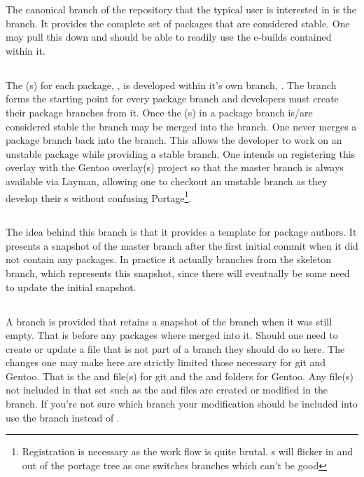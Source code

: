 \documentclass{article}
\begin{document}
The canonical branch of the repository that the typical user is interested in is the  branch. 
It provides the complete set of packages that are considered stable.
One may pull this down and should be able to readily use the e-builds contained within it.

\subsection{}

The \eBuild{}(s) for each package, , is developed within it's own branch, . 
The  branch forms the starting point for every package branch and developers must create their package branches from it.
Once the \eBuild{}(s) in a package branch is/are considered stable the branch may be merged into the  branch.
One never merges a package branch back into the  branch.
This allows the developer to work on an unstable package while providing a stable  branch.
One intends on registering this overlay with the Gentoo overlay(s) project so that the master branch is always available via Layman, allowing one to checkout an unstable branch as they develop their \eBuild{}s without confusing Portage\footnote{Registration is necessary as the work flow is quite brutal. \eBuild{}s will flicker in and out of the portage tree as one switches branches which can't be good}.

\subsection{}

The idea behind this branch is that it provides a template for package authors.
It presents a snapshot of the master branch after the first initial commit when it did not contain any packages.
In practice it actually branches from the skeleton branch, which represents this snapshot, since there will eventually be some need to update the initial snapshot.

\subsection{}

A  branch is provided that retains a snapshot of the  branch when it was still empty.
That is before any packages where merged into it.
Should one need to create or update a file that is not part of a  branch they should do so here.
The changes one may make here are strictly limited those necessary for git and Gentoo. 
That is the  and  file(s) for git and the  and  folders for Gentoo.
Any file(s) not included in that set such as the  and  files are created or modified in the  branch.
If you're not sure which branch your modification should be included into use the  branch instead of .
\end{document}
